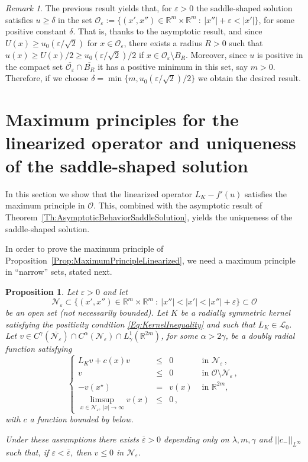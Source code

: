 \documentclass[12pt,reqno]{amsart}
\newtheorem{proposition}[theorem]{Proposition}
\theoremstyle{definition}
\theoremstyle{remark}
\newtheorem{remark}[theorem]{Remark}
\newcommand{\con}[1]{\mathbb{#1}}
\newcommand{\R}{\con{R}} %
\newcommand{\lcal}{\mathcal{L}}
\newcommand{\ncal}{\mathcal{N}}
\newcommand{\ocal}{\mathcal{O}}
\newcommand{\s}{\gamma}
\newcommand\beqc[1]{\left\{\begin{array}{#1}}
\newcommand\eeqc{\end{array} \right.}
\def\PDEsystem{rcll}
\def\ds{\displaystyle}
\numberwithin{equation}{section}
\begin{document}
\begin{remark}
	\label{Remark:u>delta}
	The previous result yields that, for $\varepsilon>0$ the saddle-shaped solution satisfies $u\geq\delta$ in the set $\ocal_\varepsilon := \{(x',x'')\in \R^m\times\R^m \ : \ |x''|+\varepsilon <|x'| \}$, for some positive constant $\delta$. That is, thanks to the asymptotic result, and since $U(x)\geq u_0(\varepsilon/\sqrt{2})$ for $x\in \ocal_\varepsilon$, there exists a radius $R>0$ such that $u(x)\geq U(x)/2\geq u_0(\varepsilon/\sqrt{2})/2$ if $x\in \ocal_\varepsilon\setminus B_R$. Moreover, since $u$ is positive in the compact set $\overline{\ocal_\varepsilon}\cap\overline{B_R}$ it has a positive minimum in this set, say $m>0$. Therefore, if we choose $\delta = \min\{m,u_0(\varepsilon/\sqrt{2})/2\}$ we obtain the desired result.
\end{remark}



\section{Maximum principles for the linearized operator and uniqueness of the saddle-shaped solution}
\label{Sec:MaximumPrinciple}

In this section we show that the linearized operator $L_K  -f'(u)$ satisfies the maximum principle in $\ocal$. This, combined with the asymptotic result of Theorem~\ref{Th:AsymptoticBehaviorSaddleSolution}, yields the uniqueness of the saddle-shaped solution.

In order to prove the maximum principle of Proposition~\ref{Prop:MaximumPrincipleLinearized}, we need a maximum principle in ``narrow'' sets, stated next.

\begin{proposition}
	\label{Prop:MaximumPrincipleNarrowDomainsOdd}
	Let $\varepsilon>0$ and let
	$$
	\ncal_\varepsilon \subset \{(x',x'')\in \R^m\times\R^m \ : \ |x''|<|x'|<|x''|+ \varepsilon\} \subset \ocal
	$$ 
	be an open set (not necessarily bounded).  
	Let $K$ be a radially symmetric kernel satisfying the positivity condition \eqref{Eq:KernelInequality} and such that $L_K\in \lcal_0$. Let $v\in C^\s(\overline{\ncal_\varepsilon})\cap C^\alpha(\ncal_\varepsilon)\cap L^1_\s(\R^{2m})$, for some $\alpha > 2\s$, be a doubly radial function satisfying
	\begin{equation}
	\label{Eq:AssumptionsMaxPNarrow}
	\beqc{\PDEsystem}
	L_K v + c(x)v&\leq & 0 &\textrm{ in } \ncal_\varepsilon\,,\\
	v &\leq & 0 &\textrm{ in } \ocal \setminus \ncal_\varepsilon\,,\\
	- v(x^\star) & = & v(x) &\textrm{ in } \R^{2m},\\
	\ds \limsup_{x\in \ncal_\varepsilon, \ |x|\to \infty} v(x) &\leq & 0\,,
	\eeqc
	\end{equation}
	with $c$ a function bounded by below.
	
	Under these assumptions there exists $\overline{\varepsilon}>0$ depending only on $\lambda, m, \s$ and $||c_-||_{L^\infty}$ such that, if $\varepsilon<\overline{\varepsilon}$, then $v \leq 0$ in $\ncal_\varepsilon$. 
\end{proposition}
\end{document}

